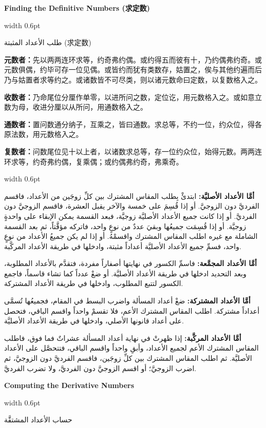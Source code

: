 \documentclass[11pt,a4paper]{article}
\newlength{\cnwidth}
\newlength{\arwidth}
\newcommand{\paralleltext}[2]{%
  \par\medskip\noindent
  \begin{minipage}[t]{\cnwidth}%
    \small #1%
  \end{minipage}%
  \hfill\textcolor{colrule}{\vrule width 0.6pt}\hfill
  \begin{minipage}[t]{\arwidth}%
    \small\arabicfont\beginR #2\endR%
  \end{minipage}%
  \par\medskip
}
\newcommand{\parallelsubsection}[2]{%
  \par\medskip\noindent
  \begin{minipage}[t]{\cnwidth}%
    \large\bfseries\color{sectioncolor} #1%
  \end{minipage}%
  \hfill\textcolor{colrule}{\vrule width 0.6pt}\hfill
  \begin{minipage}[t]{\arwidth}%
    \large\arabicfontbf\color{sectioncolor}\beginR #2\endR%
  \end{minipage}%
  \par\smallskip
}
\begin{document}
\parallelsubsection{Finding the Definitive Numbers (求定数)}{طلب الأعداد المثبتة (求定数)}

\paralleltext{%
\textbf{元数者：}先以两两连环求等，约奇弗约偶。或约得五而彼有十，乃约偶弗约奇。或元数俱偶，约毕可存一位见偶。或皆约而犹有类数存，姑置之，俟与其他约遍而后乃与姑置者求等约之。或诸数皆不可尽类，则以诸元数命曰定数，以复数格入之。

\textbf{收数者：}乃命尾位分厘作单零，以进所问之数，定位讫，用元数格入之。或如意立数为母，收进分厘以从所问，用通数格入之。

\textbf{通数者：}置问数通分纳子，互乘之，皆曰通数。求总等，不约一位，约众位，得各原法数，用元数格入之。

\textbf{复数者：}问数尾位见十以上者，以诸数求总等，存一位约众位，始得元数。两两连环求等，约奇弗约偶，复乘偶；或约偶弗约奇，弗乘奇。%
}{%
\textbf{أمَّا الأعداد الأصليَّة:} ابتدئْ بِطلب المقاس المشترك بين كلِّ زوجَين من الأعداد، فاقسم الفرديَّ دون الزوجيَّ. أو إذا قُسِمَ على خمسة والآخر يقبل العشرة، فاقسم الزوجيَّ دون الفرديَّ. أو إذا كانت جميع الأعداد الأصليَّة زوجيَّة، فبعد القسمة يمكن الإبقاء على واحدةٍ زوجيَّة. أو إذا قُسِمَت جميعُها وبقيَ عددٌ من نوعٍ واحد، فاتركه مؤقَّتاً، ثم بعد القسمة الشاملة مع غيره اطلب المقاس المشترك واقسمْهُ. أو إذا لم يكن جميعُ الأعداد من نوعٍ واحد، فسمِّ جميع الأعداد الأصليَّة أعداداً مثبتة، وادخلها في طريقة الأعداد المركَّبة.

\textbf{أمَّا الأعداد المجمَّعة:} فاسمِّ الكسور في نهايتها أصفاراً مفردة، فتقدَّم بالأعداد المطلوبة، وبعد التحديد ادخلها في طريقة الأعداد الأصليَّة. أو ضعْ عدداً كما تشاء قاسماً، فاجمع الكسور لتتبع المطلوب، وادخلها في طريقة الأعداد المشتركة.

\textbf{أمَّا الأعداد المشتركة:} ضعْ أعداد المسألة واضرب البسط في المقام، فجميعُها تُسمَّى أعداداً مشتركة. اطلب المقاس المشترك الأعم، فلا تقسمْ واحداً واقسم الباقي، فتحصل على أعداد قانونها الأصلي، وادخلها في طريقة الأعداد الأصليَّة.

\textbf{أمَّا الأعداد المركَّبة:} إذا ظهرتْ في نهاية أعداد المسألة عشراتٌ فما فوق، فاطلب المقاس المشترك الأعم لجميع الأعداد، وأبقِ واحداً واقسم الباقي، فتتحصَّل على الأعداد الأصليَّة. ثم اطلب المقاس المشترك بين كلِّ زوجَين، فاقسم الفرديَّ دون الزوجيَّ، ثم اضرب الزوجيَّ؛ أو اقسم الزوجيَّ دون الفرديَّ، ولا تضرب الفرديَّ.
}

\parallelsubsection{Computing the Derivative Numbers}{حساب الأعداد المشتقَّة}
\end{document}
